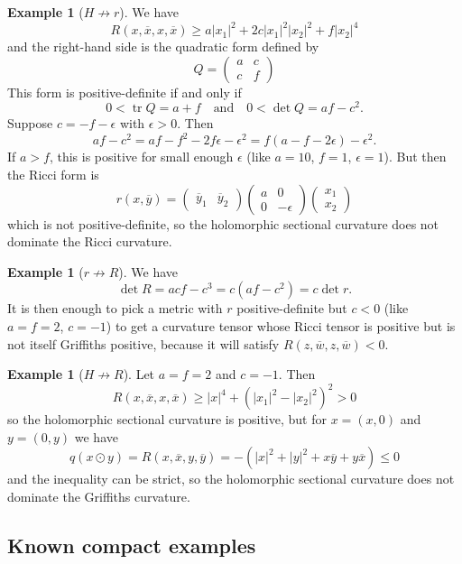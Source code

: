 \documentclass[10pt,a4paper]{amsart}
\theoremstyle{definition}
\newtheorem{exam}[theo]{Example}
\def\ov#1{\overline{#1}}
\def\qandq{\quad\text{and}\quad}
\DeclareMathOperator{\tr}{tr}
\begin{document}
\begin{exam}[$H \not\to r$]
We have
$$
R(x, \ov x, x, \ov x)
\geq
a |x_1|^2 + 2c |x_1|^2 |x_2|^2 + f |x_2|^4
$$
and the right-hand side is the quadratic form defined by
$$
Q = \begin{pmatrix}
a & c \\ c & f
\end{pmatrix}
$$
This form is positive-definite if and only if
$$
0 < \tr Q = a + f
\qandq
0 < \det Q = af - c^2.
$$
Suppose $c = -f - \epsilon$ with $\epsilon > 0$.
Then
$$
af - c^2
= af - f^2 - 2f \epsilon - \epsilon^2
= f(a - f - 2\epsilon) - \epsilon^2.
$$
If $a > f$, this is positive for small enough $\epsilon$ (like $a = 10$, $f =
1$, $\epsilon = 1$).
But then the Ricci form is
$$
r(x, \ov y) =
\begin{pmatrix}\ov y_1 & \ov y_2 \end{pmatrix}
\begin{pmatrix}
a & 0 \\ 0 & -\epsilon
\end{pmatrix}
\begin{pmatrix} x_1 \\ x_2 \end{pmatrix}
$$
which is not positive-definite,
so the holomorphic sectional curvature does not dominate the Ricci
curvature.
\end{exam}

\begin{exam}[$r \not\to R$]
We have
$$
\det R = acf - c^3 = c(af - c^2) = c \det r.
$$
It is then enough to pick a metric with $r$ positive-definite but $c < 0$
(like $a = f = 2$, $c = -1$)
to get a curvature tensor whose Ricci tensor is positive but is not itself
Griffiths positive, because it will satisfy $R(z, \ov w, z, \ov w) < 0$.
\end{exam}

\begin{exam}[$H \not\to R$]
Let $a = f = 2$ and $c = -1$.
Then
$$
R(x, \ov x, x, \ov x)
\geq |x|^4 + (|x_1|^2 - |x_2|^2)^2 > 0
$$
so the holomorphic sectional curvature is positive, but
for $x = (x,0)$ and $y = (0,y)$ we have
$$
q(x \odot y)
= R(x, \ov x, y, \ov y)
= - (|x|^2 + |y|^2 + x \ov y + y \ov x)
\leq 0
$$
and the inequality can be strict, so the holomorphic sectional curvature does
not dominate the Griffiths curvature.
\end{exam}


\subsection*{Known compact examples}
\end{document}
